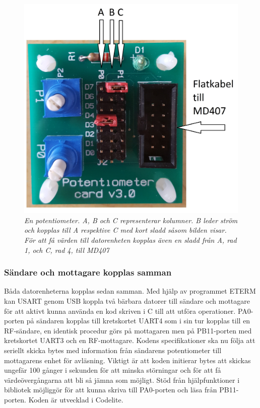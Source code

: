 \documentclass[a4paper]{article}
\begin{document}
\begin{figure}[H]
\includegraphics[scale=0.05]{PotentiometerMedRitning.jpg}
\centering
\caption{\it En potentiometer. A, B och C representerar kolumner. B leder ström och kopplas till A respektive C med kort sladd såsom bilden visar. För att få värden till datorenheten kopplas även en sladd från A, rad 1, och C, rad 4, till MD407}
\end{figure} 

\subsubsection{Sändare och mottagare kopplas samman}
\vspace{5mm} \noindent
Båda datorenheterna kopplas sedan samman. Med hjälp av programmet ETERM kan USART genom USB koppla två bärbara datorer till sändare och mottagare för att aktivt kunna använda en kod skriven i C till att utföra operationer. PA0-porten på sändaren kopplas till kretskortet UART4 som i sin tur kopplas till en RF-sändare, en identisk procedur görs på mottagaren men på PB11-porten med kretskortet UART3 och en RF-mottagare. Kodens specifikationer ska nu följa att seriellt skicka bytes med information från sändarens potentiometer till mottagarens enhet för avläsning. Viktigt är att koden initierar bytes att skickas ungefär 100 gånger i sekunden för att minska störningar och för att få värdeövergångarna att bli så jämna som möjligt. Stöd från hjälpfunktioner i bibliotek möjliggör för att kunna skriva till PA0-porten och läsa från PB11-porten. Koden är utvecklad i Codelite.
\end{document}
